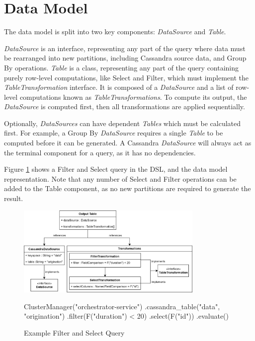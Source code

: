\section{Data Model}\label{subsec:data-model}
The data model is split into two key components: \textit{DataSource} and \textit{Table}. 

\textit{DataSource} is an interface, representing any part of the query where data must be rearranged into new partitions, including Cassandra source data, and Group By operations. \textit{Table} is a class, representing any part of the query containing purely row-level computations, like Select and Filter, which must implement the \textit{TableTransformation} interface. It is composed of a \textit{DataSource} and a list of row-level computations known as \textit{TableTransformations}. To compute its output, the \textit{DataSource} is computed first, then all transformations are applied sequentially.

Optionally, \textit{DataSources} can have dependent \textit{Tables} which must be calculated first. For example, a Group By \textit{DataSource} requires a single \textit{Table} to be computed before it can be generated. A Cassandra \textit{DataSource} will always act as the terminal component for a query, as it has no dependencies.

Figure \ref{fig:filter-select-query} shows a Filter and Select query in the DSL, and the data model representation. Note that any number of Select and Filter operations can be added to the Table component, as no new partitions are required to generate the result.

\begin{figure}[htp]
	\centering
	\includegraphics[width=0.8\textwidth]{chapters/diagrams/implementation/filter-select-query}
	\begin{python}
ClusterManager("orchestrator-service")
.cassandra_table("data", "origination")
.filter(F("duration") < 20)
.select(F("id"))
.evaluate()
	\end{python}
	\caption{Example Filter and Select Query}
	\label{fig:filter-select-query}
\end{figure}


